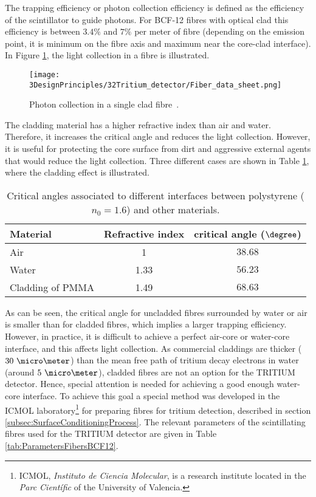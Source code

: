 The trapping efficiency or photon collection efficiency is defined as the efficiency of the scintillator to guide photons. For BCF-12 fibres with optical clad this efficiency is between $3.4\%$ and $7\%$ per meter of fibre (depending on the emission point, it is minimum on the fibre axis and maximum near the core-clad interface). In Figure \ref{fig:Fiber_physic}, the light collection in a fibre is illustrated.


\begin{figure}[htbp]
\centering
\texttt{[image: 3DesignPrinciples/32Tritium\_detector/Fiber\_data\_sheet.png]}
\caption{Photon collection in a single clad fibre\label{fig:Fiber_physic}~\cite{DataSheetBCF12Fiber}.}
\end{figure}
The cladding material has a higher refractive index than air and water. Therefore, it increases the critical angle and reduces the light collection. However, it is useful for protecting the core surface from dirt and aggressive external agents that would reduce the light collection. Three different cases are shown in Table \ref{tab:CriticalAngles}, where the cladding effect is illustrated.
\begin{table}[htbp]
\centering{}%
\begin{tabular}{lcc}
\toprule 
Material & Refractive index & critical angle ($\degree$) \tabularnewline
\midrule
\midrule 
Air & 1 & $38.68$ \tabularnewline
Water & 1.33 & $56.23$ \tabularnewline
Cladding of PMMA & 1.49 & $68.63$ \tabularnewline
\bottomrule
\end{tabular}
\caption{Critical angles associated to different interfaces between polystyrene ($n_0=1.6$) and other materials.}
\label{tab:CriticalAngles}
\end{table}
As can be seen, the critical angle for uncladded fibres surrounded by water or air is smaller than for cladded fibres, which implies a larger trapping efficiency. However, in practice, it is difficult to achieve a perfect air-core or water-core interface, and this affects light collection. As commercial claddings are thicker ($30~\micro \meter$) than the mean free path of tritium decay electrons in water (around $5~\micro\meter$), cladded fibres are not an option for the TRITIUM detector. Hence, special attention is needed for achieving a good enough water-core interface. To achieve this goal a special method was developed in the ICMOL laboratory\footnote{ICMOL, \textit{Instituto de Ciencia Molecular}, is a research institute located in the \textit{Parc Científic} of the University of Valencia.} for preparing fibres for tritium detection, described in section \ref{subsec:SurfaceConditioningProcess}. The relevant parameters of the scintillating fibres used for the TRITIUM detector are given in Table \ref{tab:ParametersFibersBCF12}.

